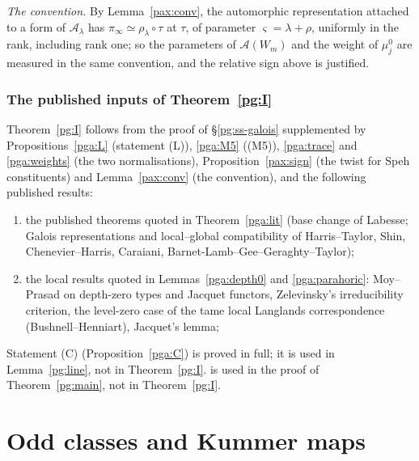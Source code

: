 \documentclass[10pt]{amsart}
\theoremstyle{definition}
\theoremstyle{remark}
\begin{document}
\emph{The convention.} By Lemma~\ref{pax:conv}, the automorphic representation attached to a form
of $\mathcal A_\lambda$ has $\pi_\infty\simeq\rho_\lambda\circ\tau$ at $\tau$, of parameter
$\varsigma=\lambda+\rho$, uniformly in the rank, including rank one; so the parameters of
$\mathcal A(W_m)$ and the weight of $\mu^0_j$ are measured in the same convention, and the relative
sign above is justified.

\subsubsection{The published inputs of Theorem~\ref{pg:I}}\label{pga:ss-status}

Theorem~\ref{pg:I} follows from the proof of \S\ref{pg:ss-galois} supplemented by
Propositions~\ref{pga:L} (statement (L)), \ref{pga:M5} ((M5)), \ref{pga:trace} and
\ref{pga:weights} (the two normalisations), Proposition~\ref{pax:sign} (the twist for Speh
constituents) and Lemma~\ref{pax:conv} (the convention), and the following published results:
\begin{enumerate}
\item[(1)] the published theorems quoted in Theorem~\ref{pga:lit} (base change of Labesse;
Galois representations and local--global compatibility of Harris--Taylor, Shin, Chenevier--Harris,
Caraiani, Barnet-Lamb--Gee--Geraghty--Taylor);
\item[(2)] the local results quoted in Lemmas~\ref{pga:depth0} and \ref{pga:parahoric}: Moy--Prasad
on depth-zero types and Jacquet functors, Zelevinsky's irreducibility criterion, the level-zero
case of the tame local Langlands correspondence (Bushnell--Henniart), Jacquet's lemma;
\end{enumerate}
Statement (C) (Proposition~\ref{pga:C}) is proved in full; it is used in Lemma~\ref{pg:line}, not
in Theorem~\ref{pg:I}. {\cite[Proposition~14.36]{P46}} is used in the proof of Theorem~\ref{pg:main},
not in Theorem~\ref{pg:I}.



\section{Odd classes and Kummer maps}\label{C3:g6}
\providecommand{\auO}{\mathcal O}
\providecommand{\pgcodd}{c_{\mathrm{odd}}}
\providecommand{\pgG}{G_E}
\providecommand{\pgcyc}{\varepsilon_\ell}
\providecommand{\prilen}{\operatorname{len}}
\providecommand{\prival}{\operatorname{val}}
\providecommand{\anrd}{\mathrm{rd}}
\providecommand{\panotodd}[1]{\par\smallskip{\raggedright\noindent\textbf{[Not proved here:} #1\textbf{]}\par}\smallskip}
\providecommand{\podSha}{\mathrm{Sha}^-}
\providecommand{\podC}{\mathcal C}
\providecommand{\podm}{\mathfrak m}
\providecommand{\podord}{\operatorname{ord}}
\providecommand{\podfr}[1]{\langle #1\rangle}
\providecommand{\podth}{\theta}
\providecommand{\podGal}{\operatorname{Gal}}
\providecommand{\podLam}{\Lambda}
\end{document}
